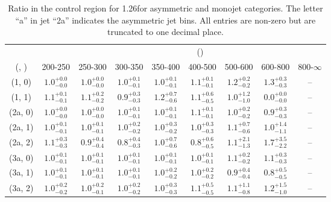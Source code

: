 \begin{table}[h!]
\tiny
\centering
\caption{Ratio in the \mj control region for 1.26\ifb for asymmetric and monojet categories. The letter ``a'' in jet \eg ``2a''  indicates the asymmetric jet bins. All entries are non-zero but are truncated to one decimal place.\label{tab:ratiosep_mu_ewk_asym}}
\begin{tabular}
{ccccccccc}
	\hline\hline
&	& \multicolumn{8}{c}{\scalht (\gev)} \\ 
	 (\njet,  \nb) & 200-250 & 250-300 & 300-350 & 350-400 & 400-500 & 500-600 & 600-800 & 800-$\infty$ \\ [0.8ex] 
\hline
	(1, 0) & $1.0^{+ 0.0 }_{- 0.0 }$ & $1.0^{+ 0.0 }_{- 0.0 }$ & $1.0^{+ 0.1 }_{- 0.1 }$ & $1.0^{+ 0.1 }_{- 0.1 }$ & $1.1^{+ 0.1 }_{- 0.1 }$ & $1.2^{+ 0.2 }_{- 0.2 }$ & $1.3^{+ 0.3 }_{- 0.3 }$ & -- \\[0.5ex] 
	(1, 1) & $1.1^{+ 0.1 }_{- 0.1 }$ & $1.1^{+ 0.2 }_{- 0.2 }$ & $0.9^{+ 0.3 }_{- 0.3 }$ & $1.2^{+ 0.7 }_{- 0.6 }$ & $1.1^{+ 0.6 }_{- 0.5 }$ & $1.0^{+ 1.2 }_{- 1.0 }$ & $0.0^{+ 0.0 }_{- 0.0 }$ & -- \\[0.5ex] 
	(2a, 0) & $1.0^{+ 0.0 }_{- 0.0 }$ & $1.0^{+ 0.0 }_{- 0.0 }$ & $1.0^{+ 0.1 }_{- 0.1 }$ & $1.0^{+ 0.1 }_{- 0.1 }$ & $1.1^{+ 0.1 }_{- 0.1 }$ & $1.0^{+ 0.2 }_{- 0.2 }$ & $0.9^{+ 0.3 }_{- 0.3 }$ & -- \\[0.5ex] 
	(2a, 1) & $1.0^{+ 0.1 }_{- 0.1 }$ & $1.0^{+ 0.1 }_{- 0.1 }$ & $1.0^{+ 0.2 }_{- 0.2 }$ & $1.0^{+ 0.3 }_{- 0.2 }$ & $1.0^{+ 0.3 }_{- 0.3 }$ & $1.1^{+ 0.7 }_{- 0.6 }$ & $1.0^{+ 1.4 }_{- 1.1 }$ & -- \\[0.5ex] 
	(2a, 2) & $1.1^{+ 0.3 }_{- 0.3 }$ & $0.9^{+ 0.4 }_{- 0.4 }$ & $0.8^{+ 0.4 }_{- 0.3 }$ & $1.0^{+ 0.7 }_{- 0.6 }$ & $0.8^{+ 0.6 }_{- 0.5 }$ & $1.1^{+ 2.1 }_{- 1.3 }$ & $1.7^{+ 3.5 }_{- 2.2 }$ & -- \\[0.5ex] 
	(3a, 0) & $1.0^{+ 0.1 }_{- 0.1 }$ & $1.0^{+ 0.1 }_{- 0.1 }$ & $1.0^{+ 0.1 }_{- 0.1 }$ & $1.0^{+ 0.1 }_{- 0.1 }$ & $1.0^{+ 0.1 }_{- 0.1 }$ & $1.1^{+ 0.2 }_{- 0.2 }$ & $1.1^{+ 0.3 }_{- 0.3 }$ & -- \\[0.5ex] 
	(3a, 1) & $1.0^{+ 0.1 }_{- 0.1 }$ & $1.0^{+ 0.1 }_{- 0.1 }$ & $1.0^{+ 0.1 }_{- 0.1 }$ & $1.0^{+ 0.2 }_{- 0.2 }$ & $1.0^{+ 0.2 }_{- 0.2 }$ & $0.9^{+ 0.4 }_{- 0.4 }$ & $0.8^{+ 0.5 }_{- 0.5 }$ & -- \\[0.5ex] 
	(3a, 2) & $1.0^{+ 0.2 }_{- 0.2 }$ & $1.0^{+ 0.2 }_{- 0.1 }$ & $1.0^{+ 0.2 }_{- 0.2 }$ & $1.0^{+ 0.3 }_{- 0.3 }$ & $1.1^{+ 0.5 }_{- 0.5 }$ & $1.1^{+ 1.1 }_{- 0.8 }$ & $1.2^{+ 1.5 }_{- 1.0 }$ & -- \\[0.5ex] 

\end{tabular}
\end{table}

